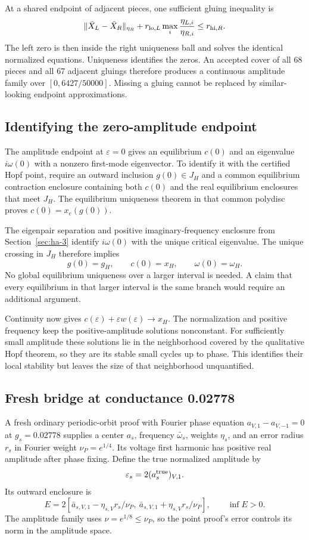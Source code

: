 \documentclass[11pt]{article}
\theoremstyle{definition}
\begin{document}
At a shared endpoint of adjacent pieces, one sufficient gluing inequality is
\[
 \|\bar X_L-\bar X_R\|_{\eta_R}
       +r_{{\rm lo},L}\max_i\frac{\eta_{L,i}}{\eta_{R,i}}
       \le r_{{\rm hi},R}.
\]
The left zero is then inside the right uniqueness ball and solves the identical normalized equations. Uniqueness identifies the zeros. An accepted cover of all 68 pieces and all 67 adjacent gluings therefore produces a continuous amplitude family over $[0,6427/50000]$. Missing a gluing cannot be replaced by similar-looking endpoint approximations.

\subsection{Identifying the zero-amplitude endpoint}\label{sec:ha-10}

The amplitude endpoint at $\varepsilon=0$ gives an equilibrium $c(0)$ and an eigenvalue $i\omega(0)$ with a nonzero first-mode eigenvector. To identify it with the certified Hopf point, require an outward inclusion $g(0)\in J_H$ and a common equilibrium contraction enclosure containing both $c(0)$ and the real equilibrium enclosures that meet $J_H$. The equilibrium uniqueness theorem in that common polydisc proves $c(0)=x_e(g(0))$.

The eigenpair separation and positive imaginary-frequency enclosure from Section~\ref{sec:ha-3} identify $i\omega(0)$ with the unique critical eigenvalue. The unique crossing in $J_H$ therefore implies
\[
 g(0)=g_H,\qquad c(0)=x_H,\qquad\omega(0)=\omega_H.
\]
No global equilibrium uniqueness over a larger interval is needed. A claim that every equilibrium in that larger interval is the same branch would require an additional argument.

Continuity now gives $c(\varepsilon)+\varepsilon w(\varepsilon)\to x_H$. The normalization and positive frequency keep the positive-amplitude solutions nonconstant. For sufficiently small amplitude these solutions lie in the neighborhood covered by the qualitative Hopf theorem, so they are its stable small cycles up to phase. This identifies their local stability but leaves the size of that neighborhood unquantified.

\subsection{Fresh bridge at conductance 0.02778}\label{sec:ha-11}

A fresh ordinary periodic-orbit proof with Fourier phase equation $a_{V,1}-a_{V,-1}=0$ at $g_s=0.02778$ supplies a center $a_s$, frequency $\bar\omega_s$, weights $\eta_s$, and an error radius $r_s$ in Fourier weight $\nu_P=e^{1/4}$. Its voltage first harmonic has positive real amplitude after phase fixing. Define the true normalized amplitude by
\[
 \varepsilon_s=2(a_s^{\rm true})_{V,1}.
\]
Its outward enclosure is
\[
 E=2\left[\bar a_{s,V,1}
             -\eta_{s,V}r_s/\nu_P,\
          \bar a_{s,V,1}
             +\eta_{s,V}r_s/\nu_P\right],
 \qquad \inf E>0.
\]
The amplitude family uses $\nu=e^{1/8}\le\nu_P$, so the point proof's error controls its norm in the amplitude space.
\end{document}
